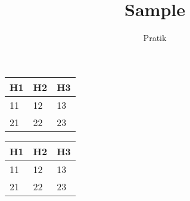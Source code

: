\documentclass[12pt]{article}
\begin{document}
\title{Sample}
\author{Pratik}\maketitle

\begin{tabular}{|l|l|l|}
\hline
H1&H2&H3 \\
\hline
11&12&13 \\
21&22&23 \\
\hline
\end{tabular}

\begin{tabular}{|l|l|l|}
\hline
H1&H2&H3 \\
\hline
11&12&13 \\
21&22&23 \\
\hline
\end{tabular}
\end{document}
